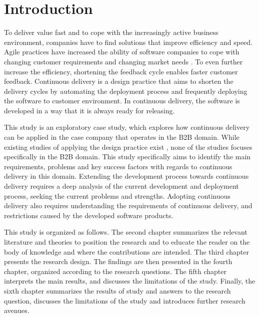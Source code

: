 \documentclass[lnbip]{svmultln}
\begin{document}
\section{Introduction}
To deliver value fast and to cope with the increasingly active business environment, companies have to find solutions that improve efficiency and speed. Agile practices \cite{cockburn2002agile} have increased the ability of software companies to cope with changing customer requirements and changing market needs \cite{dzamashvili2010impact}. To even further increase the efficiency, shortening the feedback cycle enables faster customer feedback. Continuous delivery is a design practice that aims to shorten the delivery cycles by automating the deployment process and frequently deploying the software to customer environment. In continuous delivery, the software is developed in a way that it is always ready for releasing. %

This study is an exploratory case study, which explores how continuous delivery can be applied in the case company that operates in the B2B domain. While existing studies of applying the design practice exist \cite{olsson2012climbing, neely2013continuous}, none of the studies focuses specifically in the B2B domain. This study specifically aims to identify the main requirements, problems and key success factors with regards to continuous delivery in this domain. Extending the development process towards continuous delivery requires a deep analysis of the current development and deployment process, seeking the current problems and strengths. Adopting continuous delivery also requires understanding the requirements of continuous delivery, and restrictions caused by the developed software products. 

This study is organized as follows. The second chapter summarizes the relevant literature and theories to position the research and to educate the reader on the body of knowledge and where the contributions are intended. The third chapter presents the research design. The findings are then presented in the fourth chapter, organized according to the research questions. The fifth chapter interprets the main results, and discusses the limitations of the study. Finally, the sixth chapter summarizes the results of study and answers to the research question, discusses the limitations of the study and introduces further research avenues.
\end{document}
